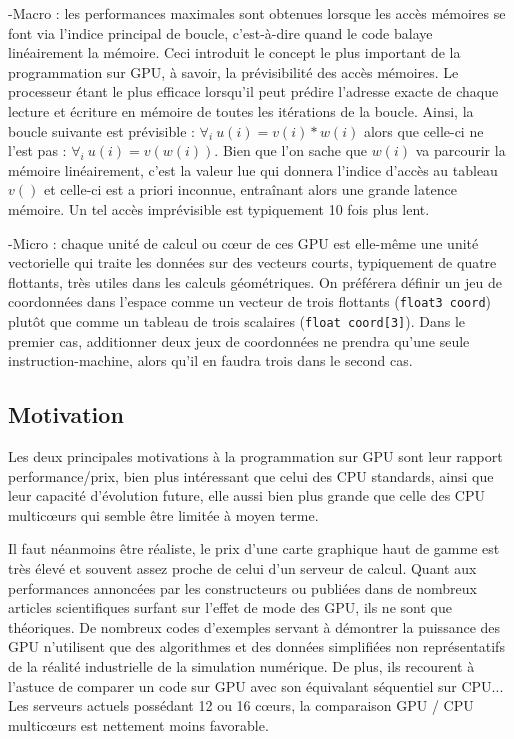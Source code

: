\documentclass[a4paper,12pt]{article}
\begin{document}
-Macro : les performances maximales sont obtenues lorsque les accès mémoires se font via l'indice principal de boucle, c'est-à-dire quand le code balaye linéairement la mémoire. Ceci introduit le concept le plus important de la programmation sur GPU, à savoir, la prévisibilité des accès mémoires. Le processeur étant le plus efficace lorsqu'il peut prédire l'adresse exacte de chaque lecture et écriture en mémoire de toutes les itérations de la boucle. Ainsi, la boucle suivante est prévisible : $\forall_{i} ~u(i)=v(i)*w(i)$ alors que celle-ci ne l'est pas : $\forall_{i} ~u(i)=v(w(i))$. Bien que l'on sache que $w(i)$ va parcourir la mémoire linéairement, c'est la valeur lue qui donnera l'indice d'accès au tableau $v()$ et celle-ci est a priori inconnue, entraînant alors une grande latence mémoire. Un tel accès imprévisible est typiquement 10 fois plus lent.

-Micro : chaque unité de calcul ou c\oe ur de ces GPU est elle-même une unité vectorielle qui traite les données sur des vecteurs courts, typiquement de quatre flottants, très utiles dans les calculs géométriques. On préférera définir un jeu de  coordonnées dans l'espace comme un vecteur de trois flottants ({\tt float3 coord}) plutôt que comme un tableau de trois scalaires ({\tt float coord[3]}). Dans le premier cas, additionner deux jeux de coordonnées ne prendra qu'une seule instruction-machine, alors qu'il en faudra trois dans le second cas.

\subsection{Motivation}
Les deux principales motivations à la programmation sur GPU sont leur rapport performance/prix, bien plus intéressant que celui des CPU standards, ainsi que leur capacité d'évolution future, elle aussi bien plus grande que celle des CPU multic\oe urs qui semble être limitée à moyen terme.

Il faut néanmoins être réaliste, le prix d'une carte graphique haut de gamme est très élevé et souvent assez proche de celui d'un serveur de calcul. Quant aux performances annoncées par les constructeurs ou publiées dans de nombreux articles scientifiques surfant sur l'effet de mode des GPU, ils ne sont que théoriques. De nombreux codes d'exemples servant à démontrer la puissance des GPU n'utilisent que des algorithmes et des données simplifiées non représentatifs de la réalité industrielle de la simulation numérique. De plus, ils recourent à l'astuce de comparer un code sur GPU avec son équivalant séquentiel sur CPU... Les serveurs actuels possédant 12 ou 16 c\oe urs, la comparaison GPU / CPU multic\oe urs est nettement moins favorable.
\end{document}
